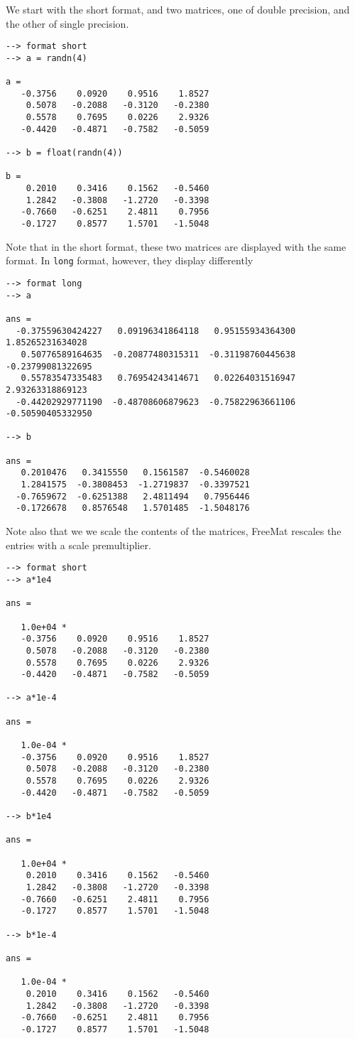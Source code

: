 We start with the short format, and two matrices, one of double precision, and the
other of single precision.
\begin{verbatim}
--> format short
--> a = randn(4)

a = 
   -0.3756    0.0920    0.9516    1.8527 
    0.5078   -0.2088   -0.3120   -0.2380 
    0.5578    0.7695    0.0226    2.9326 
   -0.4420   -0.4871   -0.7582   -0.5059 

--> b = float(randn(4))

b = 
    0.2010    0.3416    0.1562   -0.5460 
    1.2842   -0.3808   -1.2720   -0.3398 
   -0.7660   -0.6251    2.4811    0.7956 
   -0.1727    0.8577    1.5701   -1.5048 
\end{verbatim}
Note that in the short format, these two matrices are displayed with the same format.
In \verb|long| format, however, they display differently
\begin{verbatim}
--> format long
--> a

ans = 
  -0.37559630424227   0.09196341864118   0.95155934364300   1.85265231634028 
   0.50776589164635  -0.20877480315311  -0.31198760445638  -0.23799081322695 
   0.55783547335483   0.76954243414671   0.02264031516947   2.93263318869123 
  -0.44202929771190  -0.48708606879623  -0.75822963661106  -0.50590405332950 

--> b

ans = 
   0.2010476   0.3415550   0.1561587  -0.5460028 
   1.2841575  -0.3808453  -1.2719837  -0.3397521 
  -0.7659672  -0.6251388   2.4811494   0.7956446 
  -0.1726678   0.8576548   1.5701485  -1.5048176 
\end{verbatim}
Note also that we we scale the contents of the matrices, FreeMat rescales the entries
with a scale premultiplier.
\begin{verbatim}
--> format short
--> a*1e4

ans = 

   1.0e+04 * 
   -0.3756    0.0920    0.9516    1.8527 
    0.5078   -0.2088   -0.3120   -0.2380 
    0.5578    0.7695    0.0226    2.9326 
   -0.4420   -0.4871   -0.7582   -0.5059 

--> a*1e-4

ans = 

   1.0e-04 * 
   -0.3756    0.0920    0.9516    1.8527 
    0.5078   -0.2088   -0.3120   -0.2380 
    0.5578    0.7695    0.0226    2.9326 
   -0.4420   -0.4871   -0.7582   -0.5059 

--> b*1e4

ans = 

   1.0e+04 * 
    0.2010    0.3416    0.1562   -0.5460 
    1.2842   -0.3808   -1.2720   -0.3398 
   -0.7660   -0.6251    2.4811    0.7956 
   -0.1727    0.8577    1.5701   -1.5048 

--> b*1e-4

ans = 

   1.0e-04 * 
    0.2010    0.3416    0.1562   -0.5460 
    1.2842   -0.3808   -1.2720   -0.3398 
   -0.7660   -0.6251    2.4811    0.7956 
   -0.1727    0.8577    1.5701   -1.5048 
\end{verbatim}
